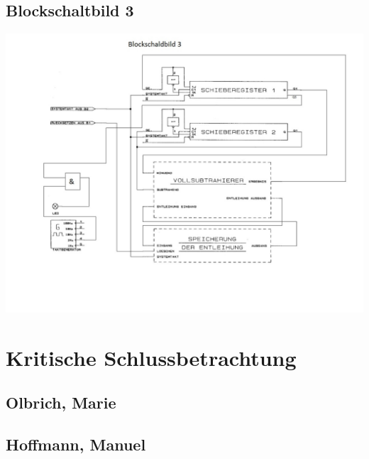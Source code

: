 \documentclass[a4paper, 11pt, fleqn, DIV=10, twoside, BCOR=10mm]{scrreprt}
\begin{document}
\section{Blockschaltbild 3}
\includegraphics[width=1.2\columnwidth]{DT2Graphics/Blockschaltbild3.jpeg}
\newpage
\chapter{Kritische Schlussbetrachtung}
\section{Olbrich, Marie}
 
\section{Hoffmann, Manuel}
 
\end{document}
